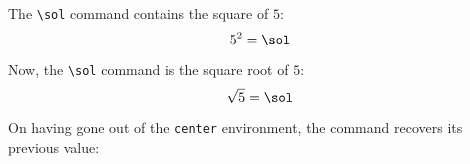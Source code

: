 \sol
The \texttt{\textbackslash sol}
command contains the square of $5$:
\[5^2=\sol\]
\begin{center}
\sol
Now, the \texttt{\textbackslash sol}
command is the square root of $5$:
\[\sqrt{5}=\sol\]
\end{center}
On having gone out of the \texttt{center}
environment,
the command recovers its previous value:
\sol

